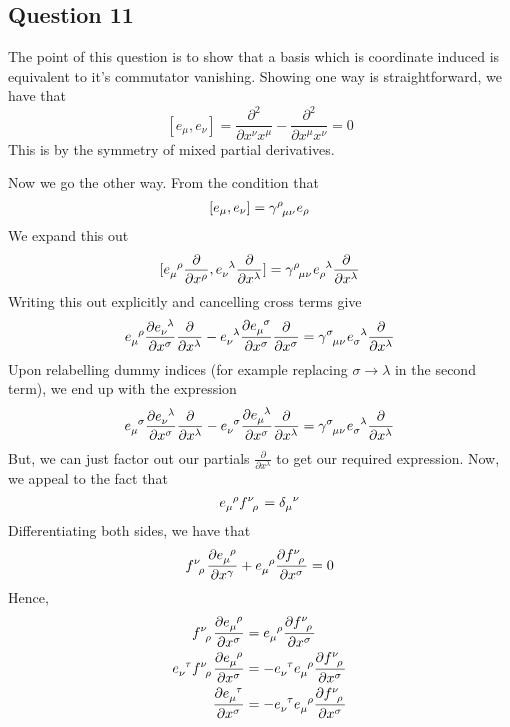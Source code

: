 \subsection{Question 11} 
The point of this question is to show that a basis which 
is coordinate induced is equivalent to it's commutator vanishing. 
Showing one way is straightforward, we have that 
\[
	[ e_\mu, e_\nu ] = \frac{\partial ^ 2 }{\partial x^\nu x^\mu  } - \frac{\partial ^ 2 }{\partial  x^\mu x^\nu} = 0   
\] This is by the symmetry of mixed partial derivatives. 

Now we go the other way. From the condition that 
\[
	[ e_\mu, e_\nu ] = \gamma \indices{^\rho _{\mu \nu }} e_{ \rho } 
\] We expand this out 
\[
	[ e \indices{ _\mu^\rho} \frac{\partial }{\partial x^\rho}, e \indices{_\nu^\lambda} \frac{\partial }{\partial  x^\lambda} ] = \gamma \indices{ ^\rho_{ \mu \nu } } e \indices{ _ \rho ^ \lambda } \frac{\partial }{\partial x ^\lambda}        
 \] Writing this out explicitly and cancelling cross terms
 give 
 \[
  e \indices{ _ \mu ^ \rho } \frac{\partial e \indices{ _ \nu ^ \lambda }  }{\partial x ^ \sigma }  \frac{\partial }{\partial x ^ \lambda }  - e \indices{ _ \nu ^ \lambda } \frac{\partial e \indices{ _ \mu ^ \sigma }  }{\partial x ^ \sigma }  \frac{\partial }{\partial x ^ \sigma } = \gamma \indices{ ^ \sigma _{ \mu \nu } } e \indices{ _\sigma ^ \lambda } \frac{\partial }{\partial x ^ \lambda }      
 \] 
 Upon relabelling dummy indices (for example replacing $ \sigma \to \lambda $ in the second term), we end up 
 with the expression 
   \[
  e \indices{ _ \mu ^ \sigma } \frac{\partial  e \indices{ _ \nu ^ \lambda }  }{\partial  x^ \sigma  }\frac{\partial }{\partial x^ \lambda }  - e \indices{ _ \nu ^ \sigma } \frac{\partial  e \indices{ _ \mu ^ \lambda }  }{\partial x ^ \sigma }  \frac{\partial }{\partial  x^ \lambda } = \gamma \indices{ ^ \sigma _{ \mu \nu } } e \indices{ _ \sigma ^ \lambda } \frac{\partial }{\partial  x^ \lambda }     
\]  But, we can just factor out our partials $ \frac{\partial }{\partial  x^ \lambda } $ to get our required expression.  Now, we appeal to the fact that 
\[
e \indices{ _ \mu ^ \rho } f \indices{ ^ \nu _ \rho } = \delta \indices{ _ \mu ^ \nu }   
\] Differentiating both sides, we have that 
\[
f \indices{ ^ \nu _ \rho } \frac{\partial  e \indices{_ \mu ^ \rho }  }{\partial x^ \gamma }  + e \indices{ _ \mu ^ \rho } \frac{\partial f \indices{ ^ \nu _ \rho }   }{\partial x^ \sigma }  = 0   
\] Hence, 
\begin{align*}
  f \indices{ ^ \nu _ \rho } \frac{\partial e \indices{_ \mu ^ \rho }  }{\partial  x ^ \sigma 	 } &=  e \indices{ _ \mu ^ \rho } \frac{\partial f \indices{ ^ \nu _ \rho }  }{\partial x^ \sigma }   \\
  e \indices{ _ \nu ^ \tau } f \indices{ ^ \nu _ \rho } \frac{\partial  e \indices{_ \mu ^ \rho }  }{\partial x^ \sigma } &=  - e \indices{_ \nu ^ \tau } e \indices{ _ \mu ^ \rho } \frac{\partial f \indices{ ^ \nu _ \rho }  }{\partial x^ \sigma }     \\
  \frac{\partial  e \indices{ _ \mu ^ \tau }  }{\partial x^ \sigma  }  &=  - e \indices{_ \nu ^ \tau  } e \indices{ _ \mu ^ \rho } \frac{\partial  f \indices{ ^ \nu _ \rho }  }{\partial x^ \sigma }    \\ 
\end{align*}
